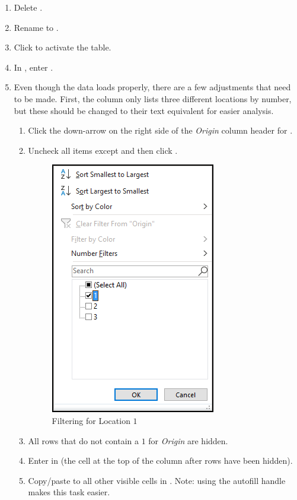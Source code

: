 \begin{enumbox}
\begin{enumerate}
		\item Delete .
		\item Rename  to .
		\item Click  to activate the table.
		\item In , enter .

		\item Even though the data loads properly, there are a few adjustments that need to be made. First, the  column only lists three different locations by number, but these should be changed to their text equivalent for easier analysis.
		
		\begin{enumerate}
			\item Click the down-arrow on the right side of the \textit{Origin} column header for .
			\item Uncheck all items except  and then click .
	
			\begin{figure}[H]
				\centering
				\includegraphics[width=\maxwidth{.60\linewidth}]{gfx/ch09_fig70}
				\caption{Filtering for Location $ 1 $}
				\label{09:fig70}
			\end{figure}
	
			\item All rows that do not contain a $ 1 $ for \textit{Origin} are hidden. 
			\item Enter  in  (the cell at the top of the column after rows have been hidden).
			\item Copy/paste  to all other visible cells in .	Note: using the autofill handle makes this task easier.
			

\end{enumerate}
\end{enumerate}
\end{enumbox}
